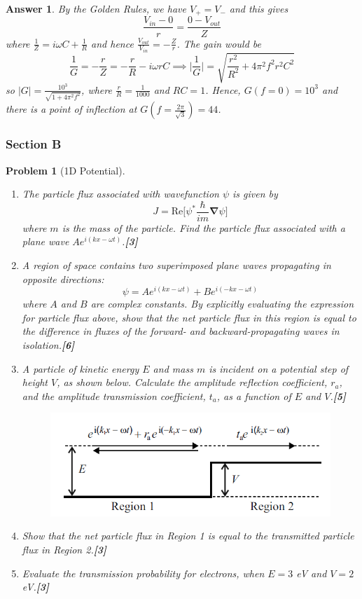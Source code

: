 \documentclass[a4paper]{article}
\newtheorem{ans}{Answer}[subsection]
\theoremstyle{new}
\newtheorem{qns}{Problem}[subsection]
\begin{document}
\begin{ans}
By the Golden Rules, we have $V_+=V_-$ and this gives
$$\frac{V_{in}-0}{r}=\frac{0-V_{out}}{Z}$$
where $\frac{1}{Z}=i\omega C+\frac{1}{R}$ and hence $\frac{V_{out}}{V_{in}}=-\frac{Z}{r}$. The gain would be
$$\frac{1}{G}=-\frac{r}{Z}=-\frac{r}{R}-i\omega rC\implies\bigg|\frac{1}{G}\bigg|=\sqrt{\frac{r^2}{R^2}+4\pi^2f^2r^2C^2}$$
so $|G|=\frac{10^3}{\sqrt{1+4\pi^2f^2}}$, where $\frac{r}{R}=\frac{1}{1000}$ and $RC=1$. Hence, $G(f=0)=10^3$ and there is a point of inflection at $G(f=\frac{2\pi}{\sqrt{3}})=44$.
\end{ans}
\newpage
\subsubsection{Section B}
\begin{qns}[1D Potential]\leavevmode
\begin{enumerate}[label=(\roman*)]
\item The particle flux associated with wavefunction $\psi$ is given by
$$J=\text{Re}\bigg[\psi^*\frac{\hbar}{im}\boldsymbol{\nabla}\psi\bigg]$$
where $m$ is the mass of the particle. Find the particle flux associated with a plane wave $Ae^{i(kx-\omega t)}$.\hfill\textbf{[3]}
\item A region of space contains two superimposed plane waves propagating in opposite directions:
$$\psi=Ae^{i(kx-\omega t)}+Be^{i(-kx-\omega t)}$$
where $A$ and $B$ are complex constants. By explicitly evaluating the expression for particle flux above, show that the net particle flux in this region is equal to the difference in fluxes of the forward- and backward-propagating waves in isolation.\hfill\textbf{[6]}
\item A particle of kinetic energy $E$ and mass $m$ is incident on a potential step of height $V$, as shown below. Calculate the amplitude reflection coefficient, $r_a$, and the amplitude transmission coefficient, $t_a$, as a function of $E$ and $V$.\hfill\textbf{[5]}
\begin{figure}[H]
    \centering
    \includegraphics[scale=0.75]{2015P1B6Q.PNG}
\end{figure}
\item Show that the net particle flux in Region 1 is equal to the transmitted particle flux in Region 2.\hfill\textbf{[3]}
\item Evaluate the transmission probability for electrons, when $E = 3$ eV and $V = 2$ eV.\hfill\textbf{[3]}
\end{enumerate}
\end{qns}
\end{document}
